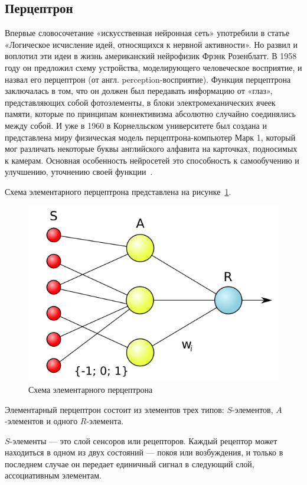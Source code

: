 \subsection{Перцептрон}

Впервые словосочетание «искусственная нейронная сеть» употребили в статье «Логическое исчисление идей, относящихся к нервной активности». Но развил и воплотил эти идеи в жизнь американский нейрофизик Фрэнк Розенблатт. В 1958 году он предложил схему устройства, моделирующего человеческое восприятие, и назвал его перцептрон (от англ. perception-восприятие). Функция перцептрона заключалась в том, что он должен был передавать информацию от «глаз», представляющих собой фотоэлементы, в блоки электромеханических ячеек памяти, которые по принципам коннективизма абсолютно случайно соединялись между собой. И уже в 1960 в Корнелльском университете был создана и представлена миру физическая модель перцептрона-компьютер Марк 1, который мог различать некоторые буквы английского алфавита на карточках, подносимых к камерам. Основная особенность нейросетей это способность к самообучению и улучшению, уточнению своей функции~\cite{tlu}. 

\clearpage

Схема элементарного перцептрона представлена на рисунке~\ref{tlu_sheme}.

\begin{figure}[H]
    \centering
    \includegraphics[width=0.6\linewidth]{images/tlu.png}
    \caption{Схема элементарного перцептрона}
    \label{tlu_sheme}
\end{figure}

Элементарный перцептрон состоит из элементов трех типов: $S$-элементов, $A$-элементов и одного $R$-элемента. 

$S$-элементы — это слой сенсоров или рецепторов. Каждый рецептор может находиться в одном из двух состояний — покоя или возбуждения, и только в последнем случае он передает единичный сигнал в следующий слой, ассоциативным элементам.


